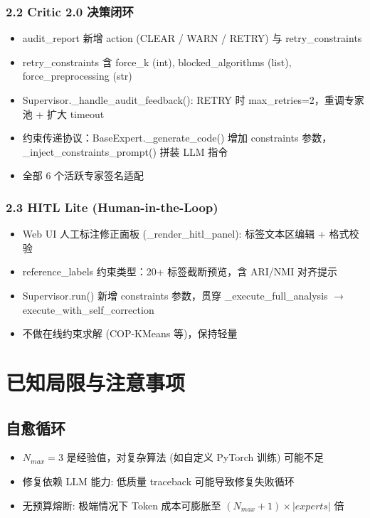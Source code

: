 \documentclass[12pt,a4paper]{article}
\begin{document}
\subsubsection{2.2 Critic 2.0 决策闭环}
\begin{itemize}[nosep]
    \item audit\_report 新增 action (CLEAR / WARN / RETRY) 与 retry\_constraints
    \item retry\_constraints 含 force\_k (int), blocked\_algorithms (list), force\_preprocessing (str)
    \item Supervisor.\_handle\_audit\_feedback(): RETRY 时 max\_retries=2，重调专家池 + 扩大 timeout
    \item 约束传递协议：BaseExpert.\_generate\_code() 增加 constraints 参数，\_inject\_constraints\_prompt() 拼装 LLM 指令
    \item 全部 6 个活跃专家签名适配
\end{itemize}

\subsubsection{2.3 HITL Lite (Human-in-the-Loop)}
\begin{itemize}[nosep]
    \item Web UI 人工标注修正面板 (\_render\_hitl\_panel): 标签文本区编辑 + 格式校验
    \item reference\_labels 约束类型：20+ 标签截断预览，含 ARI/NMI 对齐提示
    \item Supervisor.run() 新增 constraints 参数，贯穿 \_execute\_full\_analysis $\to$ execute\_with\_self\_correction
    \item 不做在线约束求解 (COP-KMeans 等)，保持轻量
\end{itemize}

\newpage

\section{已知局限与注意事项}

\subsection{自愈循环}

\begin{itemize}[nosep]
    \item $N_{max} = 3$ 是经验值，对复杂算法 (如自定义 PyTorch 训练) 可能不足
    \item 修复依赖 LLM 能力: 低质量 traceback 可能导致修复失败循环
    \item 无预算熔断: 极端情况下 Token 成本可膨胀至 $(N_{max}+1) \times |experts|$ 倍
\end{itemize}
\end{document}

